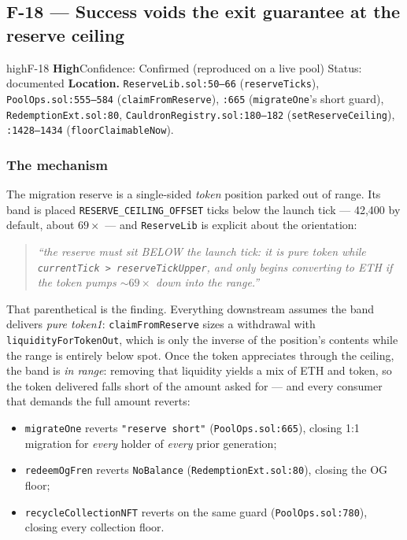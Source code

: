 \documentclass[11pt,a4paper]{article}
\newcommand{\code}[1]{\texttt{\small #1}}
\newcommand{\fileref}[1]{\texttt{\scriptsize #1}}
\begin{document}
\newpage
\subsection{F-18 --- Success voids the exit guarantee at the reserve ceiling}

\begin{findingbox}{high}{F-18 \quad \textbf{High}\quad Confidence: Confirmed (reproduced on a live pool) \quad Status: documented}
\textbf{Location.} \fileref{ReserveLib.sol:50--66} (\code{reserveTicks}),
\fileref{PoolOps.sol:555--584} (\code{claimFromReserve}), \fileref{:665}
(\code{migrateOne}'s short guard), \fileref{RedemptionExt.sol:80},
\fileref{CauldronRegistry.sol:180--182} (\code{setReserveCeiling}),
\fileref{:1428--1434} (\code{floorClaimableNow}).
\end{findingbox}

\subsubsection*{The mechanism}

The migration reserve is a single-sided \emph{token} position parked out of range.
Its band is placed \code{RESERVE\_CEILING\_OFFSET} ticks below the launch tick ---
42{,}400 by default, about $69\times$ --- and \code{ReserveLib} is explicit about the
orientation:

\begin{quote}\small\itshape
``the reserve must sit BELOW the launch tick: it is pure token while
\code{currentTick > reserveTickUpper}, and only begins converting to ETH if the
token pumps ${\sim}69\times$ down into the range.''
\end{quote}

That parenthetical is the finding. Everything downstream assumes the band delivers
\emph{pure token1}: \code{claimFromReserve} sizes a withdrawal with
\code{liquidityForTokenOut}, which is only the inverse of the position's contents
while the range is entirely below spot. Once the token appreciates through the
ceiling, the band is \emph{in range}: removing that liquidity yields a mix of ETH
and token, so the token delivered falls short of the amount asked for --- and every
consumer that demands the full amount reverts:

\begin{itemize}
\item \code{migrateOne} reverts \code{"reserve short"} (\fileref{PoolOps.sol:665}),
closing 1:1 migration for \emph{every} holder of \emph{every} prior generation;
\item \code{redeemOgFren} reverts \code{NoBalance} (\fileref{RedemptionExt.sol:80}),
closing the OG floor;
\item \code{recycleCollectionNFT} reverts on the same guard
(\fileref{PoolOps.sol:780}), closing every collection floor.
\end{itemize}
\end{document}
